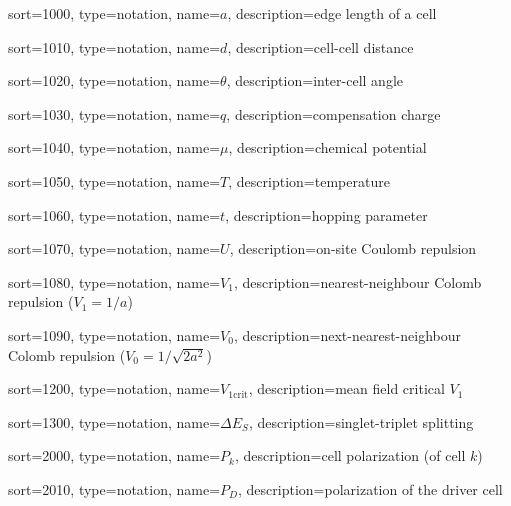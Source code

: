 {
  sort=1000,
  type=notation,
  name={\ensuremath{a}},
  description={edge length of a cell}
}

{
  sort=1010,
  type=notation,
  name={\ensuremath{d}},
  description={cell-cell distance}
}

{
  sort=1020,
  type=notation,
  name={\ensuremath{\theta}},
  description={inter-cell angle}
}

{
  sort=1030,
  type=notation,
  name={\ensuremath{q}},
  description={compensation charge}
}

{
  sort=1040,
  type=notation,
  name={\ensuremath{\mu}},
  description={chemical potential}
}

{
  sort=1050,
  type=notation,
  name={\ensuremath{T}},
  description={temperature}
}

{
  sort=1060,
  type=notation,
  name={\ensuremath{t}},
  description={hopping parameter}
}

{
  sort=1070,
  type=notation,
  name={\ensuremath{U}},
  description={on-site Coulomb repulsion}
}

{
  sort=1080,
  type=notation,
  name={\ensuremath{V_1}},
  description={nearest-neighbour Colomb repulsion ($V_1 = 1/a$)}
}

{
  sort=1090,
  type=notation,
  name={\ensuremath{V_0}},
  description={next-nearest-neighbour Colomb repulsion ($V_0 = 1/\sqrt{2a^2}$)}
}


{
  sort=1200,
  type=notation,
  name={\ensuremath{V_{1\mathrm{crit}}}},
  description={mean field critical $V_1$}
}

{
  sort=1300,
  type=notation,
  name={\ensuremath{\Delta E_S}},
  description={singlet-triplet splitting}
}

{
  sort=2000,
  type=notation,
  name={\ensuremath{P_k}},
  description={cell polarization (of cell $k$)}
}

{
  sort=2010,
  type=notation,
  name={\ensuremath{P_D}},
  description={polarization of the driver cell}
}

